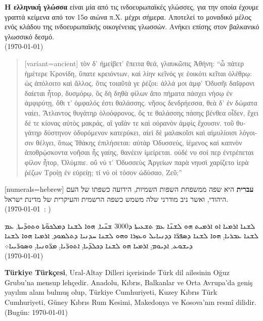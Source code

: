 \documentclass[a4paper]{article}
\begin{document}
\begin{greek}
\textbf{Η ελληνική γλώσσα} είναι μία από τις ινδοευρωπαϊκές γλώσσες, για την
οποία έχουμε γραπτά κείμενα από τον 15ο αιώνα π.Χ. μέχρι σήμερα. Αποτελεί το
μοναδικό μέλος ενός κλάδου της ινδοευρωπαϊκής οικογένειας γλωσσών. Ανήκει
επίσης στον βαλκανικό γλωσσικό δεσμό.\\	
(\today) 
\end{greek}

\begin{quote}
\begin{greek}[variant=ancient]
τὸν δ' ἠμείβετ' ἔπειτα θεά, γλαυκῶπις Ἀθήνη:
“ὦ πάτερ ἡμέτερε Κρονίδη, ὕπατε κρειόντων,
καὶ λίην κεῖνός γε ἐοικότι κεῖται ὀλέθρῳ:
ὡς ἀπόλοιτο καὶ ἄλλος, ὅτις τοιαῦτά γε ῥέζοι:
ἀλλά μοι ἀμφ' Ὀδυσῆι δαί̈φρονι δαίεται ἦτορ,
δυσμόρῳ, ὃς δὴ δηθὰ φίλων ἄπο πήματα πάσχει
νήσῳ ἐν ἀμφιρύτῃ, ὅθι τ' ὀμφαλός ἐστι θαλάσσης.
νῆσος δενδρήεσσα, θεὰ δ' ἐν δώματα ναίει,
Ἄτλαντος θυγάτηρ ὀλοόφρονος, ὅς τε θαλάσσης
πάσης βένθεα οἶδεν, ἔχει δέ τε κίονας αὐτὸς
μακράς, αἳ γαῖάν τε καὶ οὐρανὸν ἀμφὶς ἔχουσιν.
τοῦ θυγάτηρ δύστηνον ὀδυρόμενον κατερύκει,
αἰεὶ δὲ μαλακοῖσι καὶ αἱμυλίοισι λόγοισιν
θέλγει, ὅπως Ἰθάκης ἐπιλήσεται: αὐτὰρ Ὀδυσσεύς,
ἱέμενος καὶ καπνὸν ἀποθρῴσκοντα νοῆσαι
ἧς γαίης, θανέειν ἱμείρεται. οὐδέ νυ σοί περ
ἐντρέπεται φίλον ἦτορ, Ὀλύμπιε. οὔ νύ τ' Ὀδυσσεὺς
Ἀργείων παρὰ νηυσὶ χαρίζετο ἱερὰ ῥέζων
Τροίῃ ἐν εὐρείῃ; τί νύ οἱ τόσον ὠδύσαο, Ζεῦ;”
\end{greek}
\end{quote}

\begin{hebrew}[numerals=hebrew]
\textbf{עברית} היא שפה ממשפחת השפות השמיות, הידועה כשפתו של העם היהודי, ואשר ניב מודרני שלה משמש כשפה הרשמית והעיקרית של מדינת ישראל. \\
(\today\ : \hebrewtoday)
\end{hebrew}

\begin{syriac}%
ܠܫܢܐ ܐܪܡܝܐ ܐܘ ܐܪܡܝܬ ܗܘ ܠܫܢ̈ܐ ܥܡ ܬܫܥܝܬܐ ܕ\textrm{3000} ܫܢ̈ܝܐ܂ ܗܘܐ ܠܫܢܐ ܕܡܠܟܘ̈ܬܐ ܘܬܘܕ̈ܝܬܐ܂ ܥܡ ܠܫܢܐ ܥܒܪܝܐ܄ ܗܘܐ ܠܫܢܐ ܕܣܦܪ̈ܐ ܕܕܢܝܐܝܠ ܘܥܙܪܐ ܘܗܘ ܠܫܢܐ ܚܕܢܝܐ ܕܬܠܡܘܕ܂ ܐܪܡܝܐ ܗܘܐ ܠܫܢܐ ܕܝܫܘܥ܂ ܐܕܝܘܡ܄ ܐܪܡܝܐ ܗܘ ܠܫܢܐ ܕܟܠܕ̈ܝܐ܄ ܐܬܘܪ̈ܝܐ܄ ܡܪ̈ܘܢܝܐ܄ ܘܣܘܪ̈ܝܝܐ܀ \\
(\today)
\end{syriac}

\begin{turkish}
\textbf{Türkiye Türkçesi}, Ural-Altay Dilleri içerisinde Türk dil ailesinin Oğuz Grubu'na mensup lehçedir. Anadolu, Kıbrıs, Balkanlar ve Orta Avrupa'da geniş yayılım alanı bulmuş olup, Türkiye Cumhuriyeti, Kuzey Kıbrıs Türk Cumhuriyeti, Güney Kıbrıs Rum Kesimi, Makedonya ve Kosova'nın resmî dilidir. \\
(Bugün: \today)
\end{turkish}
\end{document}
